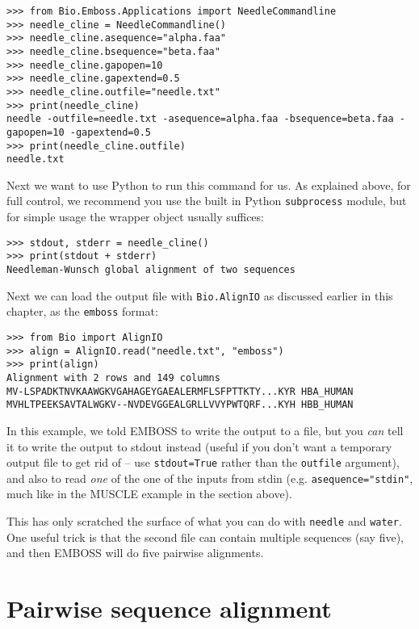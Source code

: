 \begin{verbatim}
>>> from Bio.Emboss.Applications import NeedleCommandline
>>> needle_cline = NeedleCommandline()
>>> needle_cline.asequence="alpha.faa"
>>> needle_cline.bsequence="beta.faa"
>>> needle_cline.gapopen=10
>>> needle_cline.gapextend=0.5
>>> needle_cline.outfile="needle.txt"
>>> print(needle_cline)
needle -outfile=needle.txt -asequence=alpha.faa -bsequence=beta.faa -gapopen=10 -gapextend=0.5
>>> print(needle_cline.outfile)
needle.txt
\end{verbatim}

Next we want to use Python to run this command for us. As explained above,
for full control, we recommend you use the built in Python \texttt{subprocess}
module, but for simple usage the wrapper object usually suffices:

\begin{verbatim}
>>> stdout, stderr = needle_cline()
>>> print(stdout + stderr)
Needleman-Wunsch global alignment of two sequences
\end{verbatim}

Next we can load the output file with \verb|Bio.AlignIO| as
discussed earlier in this chapter, as the \texttt{emboss} format:

\begin{verbatim}
>>> from Bio import AlignIO
>>> align = AlignIO.read("needle.txt", "emboss")
>>> print(align)
Alignment with 2 rows and 149 columns
MV-LSPADKTNVKAAWGKVGAHAGEYGAEALERMFLSFPTTKTY...KYR HBA_HUMAN
MVHLTPEEKSAVTALWGKV--NVDEVGGEALGRLLVVYPWTQRF...KYH HBB_HUMAN
\end{verbatim}

In this example, we told EMBOSS to write the output to a file, but you
\emph{can} tell it to write the output to stdout instead (useful if you
don't want a temporary output file to get rid of -- use
\texttt{stdout=True} rather than the \texttt{outfile} argument), and
also to read \emph{one} of the one of the inputs from stdin (e.g.
\texttt{asequence="stdin"}, much like in the MUSCLE example in the
section above).

This has only scratched the surface of what you can do with \texttt{needle}
and \texttt{water}. One useful trick is that the second file can contain
multiple sequences (say five), and then EMBOSS will do five pairwise
alignments.


\section{Pairwise sequence alignment}
\label{sec:pairwise}

